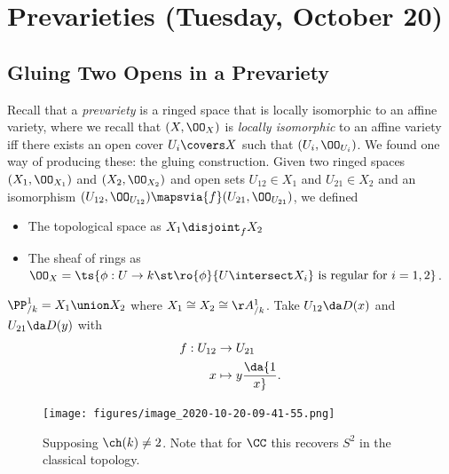 \hypertarget{prevarieties-tuesday-october-20}{%
\section{Prevarieties (Tuesday, October
20)}\label{prevarieties-tuesday-october-20}}

\hypertarget{gluing-two-opens-in-a-prevariety}{%
\subsection{Gluing Two Opens in a
Prevariety}\label{gluing-two-opens-in-a-prevariety}}

Recall that a \emph{prevariety} is a ringed space that is locally
isomorphic to an affine variety, where we recall that \((X, \OO_X)\) is
\emph{locally isomorphic} to an affine variety iff there exists an open
cover \(U_i \covers X\) such that \((U_i, \OO_{U_i})\). We found one way
of producing these: the gluing construction. Given two ringed spaces
\((X_1, \OO_{X_1})\) and \((X_2, \OO_{X_2})\) and open sets
\(U_{12} \in X_1\) and \(U_{21} \in X_2\) and an isomorphism
\((U_{12}, \OO_{U_{12}}) \mapsvia{f} (U_{21}, \OO_{U_{21}})\), we
defined

\begin{itemize}
\tightlist
\item
  The topological space as \(X_1 \disjoint_f X_2\)
\item
  The sheaf of rings as
  \(\OO_X = \ts{\phi:U\to k \st\ro{\phi}{U\intersect X_i} \text{ is regular for } i=1,2 }\).
\end{itemize}

\begin{example}

\(\PP^1_{/k} = X_1 \union X_2\) where
\(X_1 \cong X_2 \cong \AA^1_{/k}\). Take \(U_{12} \da D(x)\) and
\(U_{21} \da D(y)\) with
\begin{align*}  
f: U_{12} &\to U_{21} \\
x &\mapsto y \da {1\over x}
.\end{align*}

\begin{figure}
\centering
\texttt{[image: figures/image\_2020-10-20-09-41-55.png]}
\caption{Supposing \(\ch(k) \neq 2\). Note that for \(\CC\) this
recovers \(S^2\) in the classical topology.}
\end{figure}

\end{example}

